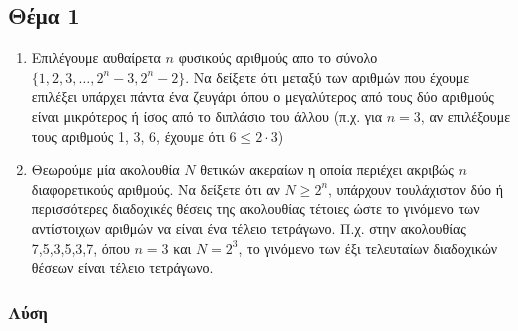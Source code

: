 \documentclass{assignment}
\begin{document}
\maketitle

\newpage\subsection*{Θέμα 1}

\begin{enumerate}

\item
Επιλέγουμε αυθαίρετα $n$ φυσικούς αριθμούς απο το σύνολο $\{1,2,3,\dots,2^n-3, 2^n-2\}$. Να δείξετε ότι μεταξύ των αριθμών που έχουμε επιλέξει υπάρχει πάντα ένα ζευγάρι όπου ο μεγαλύτερος από τους δύο αριθμούς είναι μικρότερος ή ίσος από το διπλάσιο του άλλου (π.χ. για $n=3$, αν επιλέξουμε τους αριθμούς 1, 3, 6, έχουμε ότι $6 \leq 2 \cdot 3$)
\item
Θεωρούμε μία ακολουθία $N$ θετικών ακεραίων η οποία περιέχει ακριβώς $n$ διαφορετικούς αριθμούς. 
Να δείξετε ότι αν $N \ge 2^n$, υπάρχουν τουλάχιστον δύο ή περισσότερες διαδοχικές θέσεις της ακολουθίας τέτοιες ώστε το γινόμενο των αντίστοιχων αριθμών να είναι ένα τέλειο τετράγωνο. Π.χ. στην ακολουθίας 7,5,3,5,3,7, όπου $n=3$ και $N=2^3$, το γινόμενο των έξι τελευταίων διαδοχικών θέσεων είναι τέλειο τετράγωνο.
\end{enumerate}

\subsubsection*{Λύση}
\end{document}
